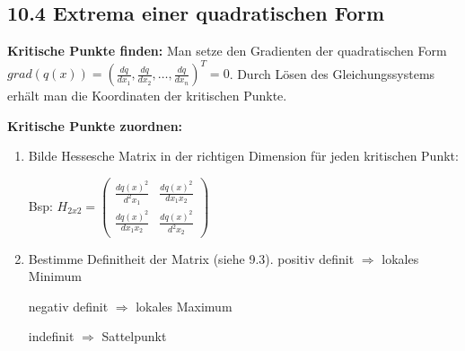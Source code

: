 \subsection{10.4 Extrema einer quadratischen Form}{
\vskip1pt
\textbf{Kritische Punkte finden:} \vskip2pt
Man setze den Gradienten der quadratischen Form $grad(q(x)) = (\frac{dq}{dx_1}, \frac{dq}{dx_2}, \hdots, \frac{dq}{dx_n})^T = 0$. Durch Lösen des Gleichungssystems erhält man die Koordinaten der kritischen Punkte.

\vskip5pt

\textbf{Kritische Punkte zuordnen:} \vskip1pt

\begin{enumerate}[label=\protect\circled{\arabic*}]
\item Bilde Hessesche Matrix in der richtigen Dimension für jeden kritischen Punkt: \par
Bsp: \hskip10pt$ H_{2x2} = \begin{pmatrix} \frac{dq(x)^2}{d^2 x_1} & \frac{dq(x)^2}{dx_1x_2} \\ \frac{dq(x)^2}{dx_1x_2} & \frac{dq(x)^2}{d^2 x_2} \end{pmatrix}$
\item Bestimme Definitheit der Matrix (siehe 9.3). \vskip2pt
positiv definit $\Longrightarrow$ lokales Minimum\par
negativ definit $\Longrightarrow$ lokales Maximum\par
indefinit $\Longrightarrow$ Sattelpunkt

\end{enumerate}
\vspace{-4pt}
}
\WhiteSpace